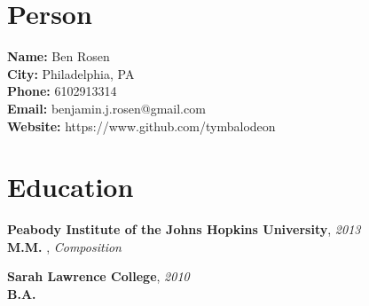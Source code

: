 \documentclass{article}
\begin{document}
\section*{Person}

\def \fullName{%
  Ben
  Rosen
}

\textbf{Name:} \fullName \\
\textbf{City:} Philadelphia, PA \\
\textbf{Phone:} 6102913314 \\
\textbf{Email:} benjamin.j.rosen@gmail.com \\
\textbf{Website:} https://www.github.com/tymbalodeon \\

\section*{Education}
  \noindent
  \textbf{Peabody Institute of the Johns Hopkins
University}, \textit{2013} \\
  \textbf{M.M.}
  , \textit{Composition}
  \vspace{1em}

  \noindent
  \textbf{Sarah Lawrence College}, \textit{2010} \\
  \textbf{B.A.}
  
  \vspace{1em}
\end{document}
